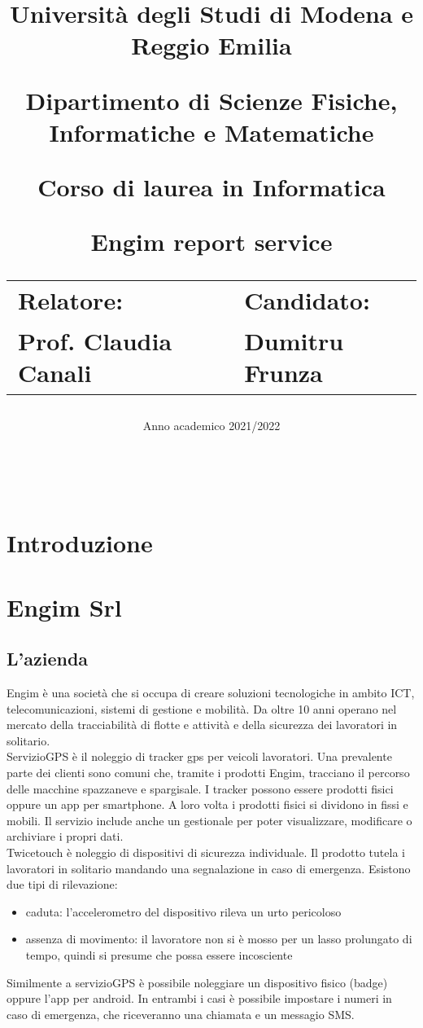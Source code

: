 \documentclass[12pt]{article}
\author{}
\title{
    \huge 
        \textbf{Università degli Studi di Modena e Reggio Emilia}
    \large
        \par Dipartimento di Scienze Fisiche, Informatiche e Matematiche
        \par Corso di laurea in Informatica
    \vfil
        \huge \par \textbf{Engim report service}
    \vfil
    \normalsize
    \begin{tabular}{lp{0.4\textwidth}l}
      Relatore: & & Candidato: \\
      Prof. Claudia Canali & &  Dumitru Frunza \\
      \end{tabular}
}
\date{Anno academico 2021/2022}
\begin{document}
\maketitle
\thispagestyle{empty}
\newpage 
\thispagestyle{empty}
\
\newpage
{}
\addtocounter{page}{0}
\listoffigures
\newpage
{}
\tableofcontents
{}
\newpage

\addtocounter{page}{0}
\section{Introduzione}
\section{Engim Srl}
\subsection{L'azienda}
Engim è una società che si occupa di creare soluzioni tecnologiche in ambito 
ICT, telecomunicazioni, sistemi di gestione e mobilità. Da oltre 10 anni operano 
nel mercato della tracciabilità di flotte e attività e della 
sicurezza dei lavoratori in solitario.
\\ ServizioGPS è il noleggio di tracker gps per veicoli lavoratori. 
Una prevalente parte dei clienti sono comuni che, tramite i prodotti Engim, 
tracciano il percorso delle macchine spazzaneve e spargisale.
I tracker possono essere prodotti fisici oppure un app per smartphone. A loro 
volta i prodotti fisici si dividono in fissi e mobili. Il servizio include
anche un gestionale per poter visualizzare, modificare o archiviare i propri dati.
\\ Twicetouch è noleggio di dispositivi di sicurezza individuale.
Il prodotto tutela i lavoratori in solitario mandando una segnalazione in caso di
emergenza. Esistono due tipi di rilevazione: 
\begin{itemize}
  \item caduta: l'accelerometro del dispositivo rileva un urto pericoloso
  \item assenza di movimento: il lavoratore non si è mosso per un lasso prolungato di tempo, 
  quindi si presume che possa essere incosciente
\end{itemize}
Similmente a servizioGPS è possibile noleggiare un dispositivo fisico (badge) oppure
l'app per android. In entrambi i casi è possibile impostare i numeri in caso di 
emergenza, che riceveranno una chiamata e un messagio SMS.
\end{document}

